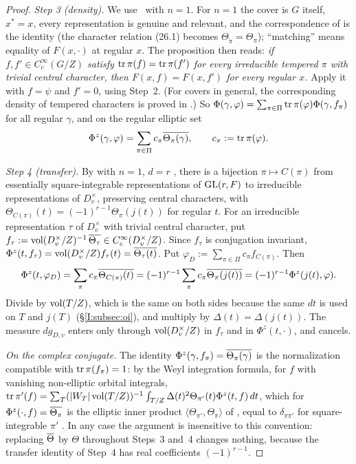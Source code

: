 \begin{proof}
\emph{Step 3 (density).} We use \cite[\S27.3, Proposition]{FK86} \Ev\ with $n=1$. For $n=1$ the cover is $G$ itself, $x^*=x$, every representation is genuine and relevant, and the correspondence of \cite[\S26]{FK86} is the identity (the character relation (26.1) becomes $\Theta_{\tilde\pi}=\Theta_\pi$); ``matching'' means equality of $F(x,\cdot)$ at regular $x$. The proposition then reads: \emph{if $f,f'\in C_c^\infty(G/Z)$ satisfy $\operatorname{tr}\pi(f)=\operatorname{tr}\pi(f')$ for every irreducible tempered $\pi$ with trivial central character, then $F(x,f)=F(x,f')$ for every regular $x$.} Apply it with $f=\psi$ and $f'=0$, using Step~2. (For covers in general, the corresponding density of tempered characters is proved in \cite{Li12}.) So $\Phi(\gamma,\varphi)=\sum_{\pi\in\Pi}\operatorname{tr}\pi(\varphi)\Phi(\gamma,f_\pi)$ for all regular $\gamma$, and on the regular elliptic set
\[ \Phi^z(\gamma,\varphi)=\sum_{\pi\in\Pi}c_\pi\overline{\Theta_\pi(\gamma)},\qquad c_\pi:=\operatorname{tr}\pi(\varphi). \]

\emph{Step 4 (transfer).} By \cite[Theorem~2.2]{Bad08} with $n=1$, $d=r$ \Ev, there is a bijection $\pi\mapsto C(\pi)$ from essentially square-integrable representations of $\mathrm{GL}(r,F)$ to irreducible representations of $D_v^\times$, preserving central characters, with $\Theta_{C(\pi)}(t)=(-1)^{r-1}\Theta_\pi(j(t))$ for regular $t$. For an irreducible representation $\tau$ of $D_v^\times$ with trivial central character, put $f_\tau:=\operatorname{vol}(D_v^\times/Z)^{-1}\,\overline{\Theta_\tau}\in C_c^\infty(D_v^\times/Z)$. Since $f_\tau$ is conjugation invariant, $\Phi^z(t,f_\tau)=\operatorname{vol}(D_v^\times/Z)f_\tau(t)=\overline{\Theta_\tau(t)}$. Put $\varphi_D:=\sum_{\pi\in\Pi}c_\pi f_{C(\pi)}$. Then
\[ \Phi^z(t,\varphi_D)=\sum_\pi c_\pi\overline{\Theta_{C(\pi)}(t)}=(-1)^{r-1}\sum_\pi c_\pi\overline{\Theta_\pi(j(t))}=(-1)^{r-1}\Phi^z(j(t),\varphi). \]
Divide by $\operatorname{vol}(T/Z)$, which is the same on both sides because the same $dt$ is used on $T$ and $j(T)$ (\S\ref{I:subsec:oi}), and multiply by $\Delta(t)=\Delta(j(t))$. The measure $dg_{D,v}$ enters only through $\operatorname{vol}(D_v^\times/Z)$ in $f_\tau$ and in $\Phi^z(t,\cdot)$, and cancels.

\emph{On the complex conjugate.} The identity $\Phi^z(\gamma,f_\pi)=\overline{\Theta_\pi(\gamma)}$ is the normalization compatible with $\operatorname{tr}\pi(f_\pi)=1$: by the Weyl integration formula, for $f$ with vanishing non-elliptic orbital integrals, $\operatorname{tr}\pi'(f)=\sum_T(|W_T|\operatorname{vol}(T/Z))^{-1}\int_{T/Z}\Delta(t)^2\Theta_{\pi'}(t)\Phi^z(t,f)\,dt$, which for $\Phi^z(\cdot,f)=\overline{\Theta_\pi}$ is the elliptic inner product $\langle\Theta_{\pi'},\Theta_\pi\rangle$ of \cite[\S24]{FK86}, equal to $\delta_{\pi\pi'}$ for square-integrable $\pi'$ \cite[\S25]{FK86}. In any case the argument is insensitive to this convention: replacing $\overline{\Theta}$ by $\Theta$ throughout Steps~3 and~4 changes nothing, because the transfer identity of Step~4 has real coefficients $(-1)^{r-1}$.
\end{proof}


